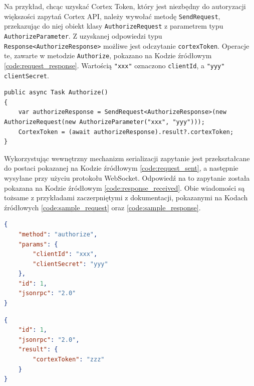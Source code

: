 \documentclass[skorowidz,skroty]{dyplomWEZUT}
\begin{document}
Na przykład, chcąc uzyskać Cortex Token, który jest niezbędny do autoryzacji większości zapytań Cortex API, należy wywołać metodę \lstinline[language={[Sharp]C}]{SendRequest}, przekazując do niej obiekt klasy \lstinline[language={[Sharp]C}]{AuthorizeRequest} z parametrem typu \lstinline[language={[Sharp]C}]{AuthorizeParameter}. Z uzyskanej odpowiedzi typu \lstinline[language={[Sharp]C}]{Response<AuthorizeResponse>} możliwe jest odczytanie \lstinline[language={[Sharp]C}]{cortexToken}. Operacje te, zawarte w metodzie \lstinline[language={[Sharp]C}]{Authorize}, pokazano na Kodzie źródłowym \vref{code:request_response}. Wartością \lstinline[language={[Sharp]C}]{"xxx"} oznaczono \lstinline[language={[Sharp]C}]{clientId}, a \lstinline[language={[Sharp]C}]{"yyy"} \lstinline[language={[Sharp]C}]{clientSecret}.

\begin{lstlisting}[language={[Sharp]C}]
public async Task Authorize()
{
    var authorizeResponse = SendRequest<AuthorizeResponse>(new AuthorizeRequest(new AuthorizeParameter("xxx", "yyy")));
    CortexToken = (await authorizeResponse).result?.cortexToken;
}
\end{lstlisting}

Wykorzystując wewnętrzny mechanizm serializacji zapytanie jest przekształcane do postaci pokazanej na Kodzie źródłowym \vref{code:request_sent}, a następnie wysyłane przy użyciu protokołu WebSocket. Odpowiedź na to zapytanie została pokazana na Kodzie źródłowym \vref{code:response_received}. Obie wiadomości są tożsame z przykładami zaczerpniętymi z dokumentacji, pokazanymi na Kodach źródłowych \vref{code:sample_request} oraz \vref{code:sample_response}.

\begin{lstlisting}[language=json]
{
    "method": "authorize",
    "params": {
        "clientId": "xxx",
        "clientSecret": "yyy"
    },
    "id": 1,
    "jsonrpc": "2.0"
}
\end{lstlisting}

\begin{lstlisting}[language=json]
{
    "id": 1,
    "jsonrpc": "2.0",
    "result": {
        "cortexToken": "zzz"
    }
}
\end{lstlisting}
\end{document}
